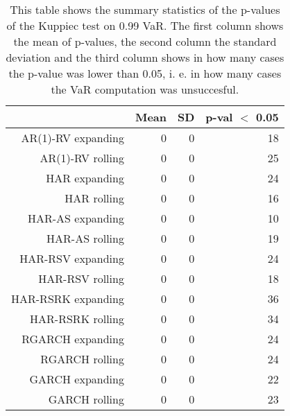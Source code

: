 \begin{table}[ht]
\centering
\begin{tabular}{rrrr}
  \hline
 & Mean & SD & p-val $<$ 0.05 \\ 
  \hline
AR(1)-RV expanding & 0 & 0 & 18 \\ 
  AR(1)-RV rolling & 0 & 0 & 25 \\ 
  HAR expanding & 0 & 0 & 24 \\ 
  HAR rolling & 0 & 0 & 16 \\ 
  HAR-AS expanding & 0 & 0 & 10 \\ 
  HAR-AS rolling & 0 & 0 & 19 \\ 
  HAR-RSV expanding & 0 & 0 & 24 \\ 
  HAR-RSV rolling & 0 & 0 & 18 \\ 
  HAR-RSRK expanding & 0 & 0 & 36 \\ 
  HAR-RSRK rolling & 0 & 0 & 34 \\ 
  RGARCH expanding & 0 & 0 & 24 \\ 
  RGARCH rolling & 0 & 0 & 24 \\ 
  GARCH expanding & 0 & 0 & 22 \\ 
  GARCH rolling & 0 & 0 & 23 \\ 
   \hline
\end{tabular}
\caption[Kupiec test p-values summary, alpha =0.99]{This table shows the summary statistics of the p-values of the Kuppiec test on 0.99 VaR. 
            The first column shows the mean of p-values, the second column the standard deviation 
            and the third column shows in how many cases the p-value was lower than 0.05, i. e. in how many cases the VaR computation was unsuccesful.} 
\label{Table:Kupiec_test_summary_0.99}
\end{table}
